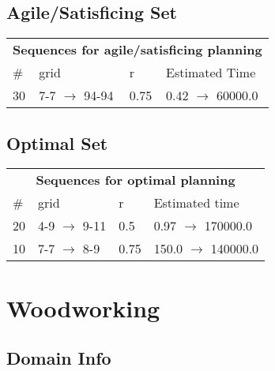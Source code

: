 \documentclass{article}
\begin{document}
                         \subsection*{Agile/Satisficing Set}

                        \begin{center}
                        \begin{tabular}{l|l|l|l}
                        \multicolumn{4}{c}{\bf \large Sequences for agile/satisficing planning}\\
                        \# & grid & r & Estimated Time\\\midrule
                        30&7-7 $\rightarrow$ 94-94&0.75&0.42 $\rightarrow$ 60000.0
                        \end{tabular}
                        \end{center}
                    
                            \subsection*{Optimal Set}

                            \begin{center}
                            \begin{tabular}{l|l|l|l}
                            \multicolumn{4}{c}{\bf \large Sequences for optimal planning}\\
                            \# & grid & r & Estimated time\\\midrule
                            20&4-9 $\rightarrow$ 9-11&0.5&0.97 $\rightarrow$ 170000.0\\
10&7-7 $\rightarrow$ 8-9&0.75&150.0 $\rightarrow$ 140000.0
                            \end{tabular}
                            \end{center}
                    \newpage \section{Woodworking}
                    \subsection*{Domain Info}
\end{document}
